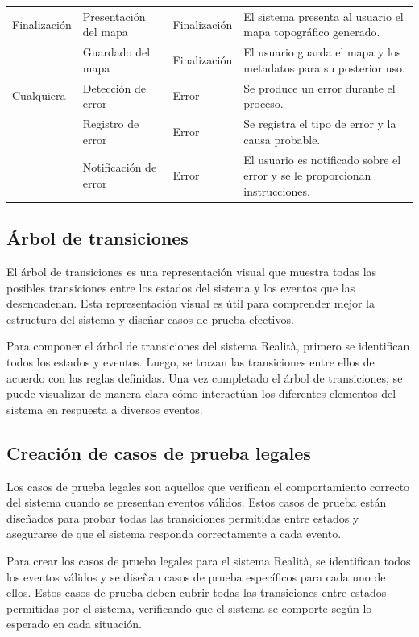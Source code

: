 \documentclass[12pt,a4paper, twoside]{article} %
\begin{document}
\begin{table}[htbp]
{\begin{tabular}{|p{2.5cm}|p{5cm}|p{3.5cm}|p{7cm}|}
Finalización & Presentación del mapa & Finalización & El sistema presenta al usuario el mapa topográfico generado. \\
 & Guardado del mapa & Finalización & El usuario guarda el mapa y los metadatos para su posterior uso. \\ \hline
Cualquiera & Detección de error & Error & Se produce un error durante el proceso. \\
 & Registro de error & Error & Se registra el tipo de error y la causa probable. \\
 & Notificación de error & Error & El usuario es notificado sobre el error y se le proporcionan instrucciones. \\ \hline
\end{tabular}%
}
\end{table}
\newpage

\subsection{Árbol de transiciones}
\label{sec:requisitos-especificos}

El árbol de transiciones es una representación visual que muestra todas las posibles transiciones entre los estados del sistema y los eventos que las desencadenan. Esta representación visual es útil para comprender mejor la estructura del sistema y diseñar casos de prueba efectivos.

Para componer el árbol de transiciones del sistema Realità, primero se identifican todos los estados y eventos. Luego, se trazan las transiciones entre ellos de acuerdo con las reglas definidas. Una vez completado el árbol de transiciones, se puede visualizar de manera clara cómo interactúan los diferentes elementos del sistema en respuesta a diversos eventos.



\subsection{Creación de casos de prueba legales}
\label{sec:requisitos-especificos}

Los casos de prueba legales son aquellos que verifican el comportamiento correcto del sistema cuando se presentan eventos válidos. Estos casos de prueba están diseñados para probar todas las transiciones permitidas entre estados y asegurarse de que el sistema responda correctamente a cada evento.

Para crear los casos de prueba legales para el sistema Realità, se identifican todos los eventos válidos y se diseñan casos de prueba específicos para cada uno de ellos. Estos casos de prueba deben cubrir todas las transiciones entre estados permitidas por el sistema, verificando que el sistema se comporte según lo esperado en cada situación.
\end{document}
